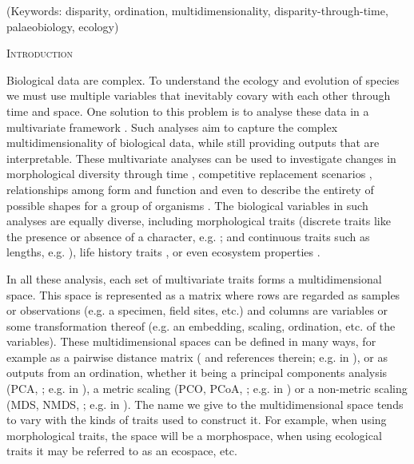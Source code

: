 \documentclass[12pt,letterpaper]{article}
\renewcommand{\section}[1]{%
\bigskip
\begin{center}
\begin{Large}
\normalfont\scshape #1
\medskip
\end{Large}
\end{center}}
\begin{document}
\noindent (Keywords: disparity, ordination, multidimensionality, disparity-through-time, palaeobiology, ecology)\\

\vspace{1.5in}

\newpage 

%
%

\section{Introduction}

Biological data are complex.
To understand the ecology and evolution of species we must use multiple variables that inevitably covary with each other through time and space.
One solution to this problem is to analyse these data in a multivariate framework \citep[e.g.][]{price2015predation,diaz2016global}.
Such analyses aim to capture the complex multidimensionality of biological data, while still providing outputs that are interpretable.
These multivariate analyses can be used to investigate changes in morphological diversity through time \citep[e.g][]{Close2015}, competitive replacement scenarios \citep[e.g.][]{Brusatte12092008}, relationships among form and function \citep[e.g.][]{diaz2016global} and even to describe the entirety of possible shapes for a group of organisms \citep[e.g.][]{raup1966geometric}.
The biological variables in such analyses are equally diverse, including morphological traits (discrete traits like the presence or absence of a character, e.g. \citealt{Close2015}; and continuous traits such as lengths, e.g. \citealt{price2015predation}), life history traits \citep[e.g.][]{diaz2016global}, or even ecosystem properties \citep[e.g.][]{DonohueDim}. 

In all these analysis, each set of multivariate traits forms a multidimensional space.
This space is represented as a matrix where rows are regarded as samples or observations (e.g. a specimen, field sites, etc.) and columns are variables or some transformation thereof (e.g. an embedding, scaling, ordination, etc. of the variables).
These multidimensional spaces can be defined in many ways, for example as a pairwise distance matrix (\citealt{lloyd2016estimating} and references therein; e.g. in \citealt{Close2015}), or as outputs from an ordination, whether it being a principal components analysis (PCA,
\citealt{PCA}; e.g. in \citealt{zelditch2012geometric} ), a metric scaling (PCO, PCoA, \citealt{PCO} ; e.g. in \citealt{Brusatte12092008} ) or a non-metric scaling (MDS, NMDS, \citealt{MDS}
; e.g. in \citealt{Liow2004,DonohueDim}).
The name we give to the multidimensional space tends to vary with the kinds of traits used to construct it. 
For example, when using morphological traits, the space will be a morphospace, when using ecological traits it may be referred to as an ecospace, etc.
\end{document}
